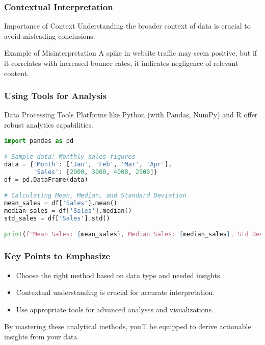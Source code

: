 \documentclass[aspectratio=169]{beamer}
\begin{document}
\begin{frame}
    \frametitle{Contextual Interpretation}
    \begin{block}{Importance of Context}
        Understanding the broader context of data is crucial to avoid misleading conclusions.
    \end{block}
    \begin{exampleblock}{Example of Misinterpretation}
        A spike in website traffic may seem positive, but if it correlates with increased bounce rates, it indicates negligence of relevant content.
    \end{exampleblock}
\end{frame}

\begin{frame}[fragile]
    \frametitle{Using Tools for Analysis}
    \begin{block}{Data Processing Tools}
        Platforms like Python (with Pandas, NumPy) and R offer robust analytics capabilities.
    \end{block}
    
    \begin{lstlisting}[language=Python]
import pandas as pd

# Sample data: Monthly sales figures
data = {'Month': ['Jan', 'Feb', 'Mar', 'Apr'],
        'Sales': [2000, 3000, 4000, 2500]}
df = pd.DataFrame(data)

# Calculating Mean, Median, and Standard Deviation
mean_sales = df['Sales'].mean()
median_sales = df['Sales'].median()
std_sales = df['Sales'].std()

print(f"Mean Sales: {mean_sales}, Median Sales: {median_sales}, Std Dev: {std_sales}")
    \end{lstlisting}
\end{frame}

\begin{frame}
    \frametitle{Key Points to Emphasize}
    \begin{itemize}
        \item Choose the right method based on data type and needed insights.
        \item Contextual understanding is crucial for accurate interpretation.
        \item Use appropriate tools for advanced analyses and visualizations.
    \end{itemize}

    By mastering these analytical methods, you'll be equipped to derive actionable insights from your data.
\end{frame}
\end{document}
